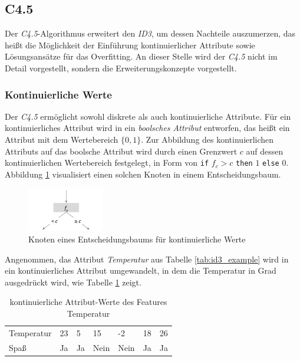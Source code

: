 \subsection{C4.5}
\label{sec:c45}

Der \emph{C4.5}-Algorithmus erweitert den \emph{ID3}, um dessen Nachteile auszumerzen, das heißt die Möglichkeit der Einführung kontinuierlicher Attribute sowie Lösungsansätze für das Overfitting. An dieser Stelle wird der \emph{C4.5} nicht im Detail vorgestellt, sondern die Erweiterungskonzepte vorgestellt. \cite[S. 66]{machine_mitchell}

\subsubsection*{Kontinuierliche Werte}
Der \emph{C4.5} ermöglicht sowohl diskrete als auch kontinuierliche Attribute. Für ein kontinuierliches Attribut wird in ein \emph{boolsches Attribut} entworfen, das heißt ein Attribut mit dem Wertebereich $\{0,1\}$. Zur Abbildung des kontinuierlichen Attributs auf das boolsche Attribut wird durch einen Grenzwert $c$ auf dessen kontinuierlichen Wertebereich festgelegt, in Form von \texttt{if} $f_c > c$ \texttt{then} $1$ \texttt{else} $0$. Abbildung \ref{img:c45_contvalue} visualisiert einen solchen Knoten in einem Entscheidungsbaum. \cite[S. 72]{machine_mitchell}

\begin{figure}[h]
	\centering
	\includegraphics[width=0.3\textwidth]{bilder/c45_contvalue.png}
	\caption{Knoten eines Entscheidungsbaums für kontinuierliche Werte}
	\label{img:c45_contvalue}
\end{figure}

Angenommen, das Attribut \emph{Temperatur} aus Tabelle \ref{tab:id3_example} wird in ein kontinuierliches Attribut umgewandelt, in dem die Temperatur in Grad ausgedrückt wird, wie Tabelle \ref{tab:c45-example} zeigt. 

\begin{table}[h]
	\centering
	\caption{kontinuierliche Attribut-Werte des Features \glqq Temperatur\grqq }
	\label{tab:c45-example}
	\begin{tabular}{lllllll}
		\toprule
		Temperatur & 23   & 5   & 15 & -2 & 18 & 26  \\
		Spaß       & Ja & Ja & Nein & Nein & Ja &Ja \\ \bottomrule
	\end{tabular}
\end{table}

